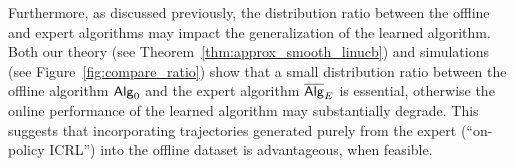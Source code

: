Furthermore, as discussed previously, the distribution ratio between the offline and expert algorithms may impact the generalization of the learned algorithm. Both our theory (see Theorem~\ref{thm:approx_smooth_linucb}) and simulations (see Figure~\ref{fig:compare_ratio}) show that a small distribution ratio between the offline algorithm ${\mathsf{Alg}}_0$ and the expert algorithm $\overline{\mathsf{Alg}}_{{E}}$ is essential, otherwise the online performance of the learned algorithm may substantially degrade. This suggests that incorporating trajectories generated purely from the expert (``on-policy ICRL'') into the offline dataset is advantageous, when feasible.

